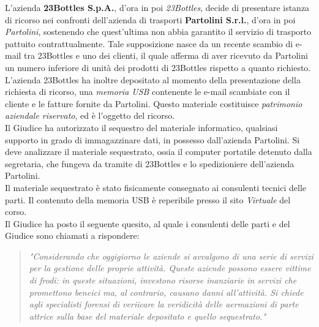 L’azienda \textbf{23Bottles S.p.A.}, d’ora in poi \textit{23Bottles}, decide di presentare istanza di ricorso nei confronti dell’azienda di trasporti \textbf{Partolini S.r.l.}, d’ora in poi \textit{Partolini}, sostenendo che quest’ultima non abbia garantito il servizio di trasporto pattuito contrattualmente. Tale supposizione nasce da un recente scambio di e-mail tra 23Bottles e uno dei clienti, il quale afferma di aver ricevuto da Partolini un numero inferiore di unità dei prodotti di 23Bottles rispetto a quanto richiesto.\vspace{14pt}\\
L’azienda 23Bottles ha inoltre depositato al momento della presentazione della richiesta di ricorso, una \textit{memoria USB} contenente le e-mail scambiate con il cliente e le fatture fornite da Partolini. Questo materiale costituisce \textit{patrimonio aziendale riservato}, ed è l’oggetto del ricorso.\vspace{14pt}\\
Il Giudice ha autorizzato il sequestro del materiale informatico, qualsiasi supporto in grado di immagazzinare dati, in possesso dall’azienda Partolini. Si deve analizzare il materiale sequestrato, ossia il computer portatile detenuto dalla segretaria, che fungeva da tramite di 23Bottles e lo spedizioniere dell’azienda Partolini.\vspace{14pt}\\
Il materiale sequestrato è stato fisicamente consegnato ai consulenti tecnici delle parti. Il contenuto della memoria USB è reperibile presso il sito \textit{Virtuale} del corso.\vspace{14pt}\\
Il Giudice ha posto il seguente quesito, al quale i consulenti delle parti e del Giudice sono chiamati a rispondere:
\begin{quote}
    \textit{"Considerando che oggigiorno le aziende si avvalgono di una serie di
    servizi per la gestione delle proprie attività. Queste aziende possono essere
    vittime di frodi: in queste situazioni, investono risorse inanziarie in servizi
    che promettono beneici ma, al contrario, causano danni all’attività. 
    Si chiede agli specialisti forensi di veriicare la veridicità delle
    aermazioni di parte attrice sulla base del materiale depositato e quello
    sequestrato."}
\end{quote}